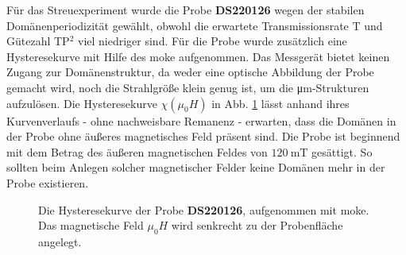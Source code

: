 \noindent
Für das Streuexperiment wurde die Probe \textbf{DS220126} wegen der stabilen Domänenperiodizität gewählt, obwohl die erwartete Transmissionsrate $\text{T}$ und Gütezahl TP$^2$ viel niedriger sind. Für die Probe wurde zusätzlich eine Hysteresekurve mit Hilfe des \gls{moke} aufgenommen. Das Messgerät bietet keinen Zugang zur Domänenstruktur, da weder eine optische Abbildung der Probe gemacht wird, noch die Strahlgröße klein genug ist, um die \si{\micro\meter}-Strukturen aufzulösen. Die Hysteresekurve $\chi(\mu_0 H)$ in Abb. \ref{fig:hysterese_sample} lässt anhand ihres Kurvenverlaufs - ohne nachweisbare Remanenz - erwarten, dass die Domänen in der Probe ohne äußeres magnetisches Feld präsent sind. Die Probe ist beginnend mit dem Betrag des äußeren magnetischen Feldes von $\SI{120}{\milli\tesla}$ gesättigt. So sollten beim Anlegen solcher magnetischer Felder keine Domänen mehr in der Probe existieren.
\begin{figure}[H]
    \centering
    
    \caption{Die Hysteresekurve der Probe \textbf{DS220126}, aufgenommen mit \gls{moke}. Das magnetische Feld $\mu_0 H$ wird senkrecht zu der Probenfläche angelegt.}
    \label{fig:hysterese_sample}
\end{figure}
\newpage



